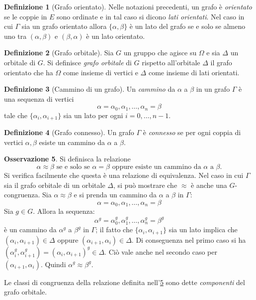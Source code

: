 \documentclass[12pt,a4paper,openright]{report}
\newcommand{\0}{\setminus\{0\}} %
\theoremstyle{definition}
\newtheorem{defn}{Definizione}[chapter]
\newtheorem{oss}[defn]{Osservazione}
\theoremstyle{plain}
\begin{document}
\begin{defn}[Grafo orientato] Nelle notazioni precedenti, un grafo è \emph{orientato} se le coppie in $E$ sono ordinate e in tal caso si dicono \emph{lati orientati}.
Nel caso in cui $\Gamma$ sia un grafo orientato allora $\{\alpha,\beta\}$ è un lato del grafo se e solo se almeno uno tra $\left(\alpha,\beta\right)$ e $\left(\beta,\alpha\right)$ è un lato orientato.
\end{defn}
\begin{defn}[Grafo orbitale]
Sia $G$ un gruppo che agisce su $\Omega$ e sia $\Delta$ un orbitale di $G$. Si definisce \emph{grafo orbitale} di $G$ rispetto all'orbitale $\Delta$ il grafo orientato che ha $\Omega$ come insieme di vertici e $\Delta$ come insieme di lati orientati.
\end{defn}
\begin{defn}[Cammino di un grafo]
    Un \emph{cammino} da $\alpha$ a $\beta$ in un grafo $\Gamma$ è una sequenza di vertici
    \[\alpha=\alpha_0,\alpha_1,\ldots,\alpha_n=\beta\]
    tale che $\{\alpha_i,\alpha_{i+1}\}$ sia un lato per ogni $i=0,\ldots,n-1$. 
\end{defn}
\begin{defn}[Grafo connesso]
    Un grafo $\Gamma$ è \emph{connesso} se per ogni coppia di vertici $\alpha,\beta$ esiste un cammino da $\alpha$ a $\beta$. 
\end{defn}
\begin{oss}\label{oss:comp_connesse}
    Si definisca la relazione 
    \[\alpha \approx \beta \mbox{ se e solo se } \alpha=\beta \mbox{ oppure esiste un cammino da } \alpha \mbox{ a } \beta.\] Si verifica facilmente che questa è una relazione di equivalenza. Nel caso in cui $\Gamma$ sia il grafo orbitale di un orbitale $\Delta$, si può mostrare che $\approx$ è anche una $G$-congruenza. Sia $\alpha \approx \beta$ e si prenda un cammino da $\alpha$ a $\beta$ in $\Gamma$:
    \[\alpha=\alpha_0,\alpha_1,\dotsc,\alpha_n=\beta\]
    Sia $g \in G$. Allora la sequenza:
    \[\alpha^g=\alpha_0^g,\alpha_1^g,\dotsc,\alpha_n^g=\beta^g\]
    è un cammino da $\alpha^g$ a $\beta^g$ in $\Gamma$; il fatto che $\{\alpha_{i},\alpha_{i+1} \}$ sia un lato implica che $\left( \alpha_{i}, \alpha_{i+1} \right) \in \Delta$ oppure $\left(\alpha_{i+1},\alpha_{i}\right) \in \Delta$. 
    Di conseguenza nel primo caso si ha $\left(\alpha_i^g,\alpha_{i+1}^g\right)=\left(\alpha_i,\alpha_{i+1}\right)^g \in \Delta$. Ciò vale anche nel secondo caso per $\left(\alpha_{i+1},\alpha_{i}\right)$. Quindi $\alpha^g \approx \beta^g$.
\end{oss}
Le classi di congruenza della relazione definita nell'\cref{oss:comp_connesse} sono dette \emph{componenti} del grafo orbitale.
\end{document}
